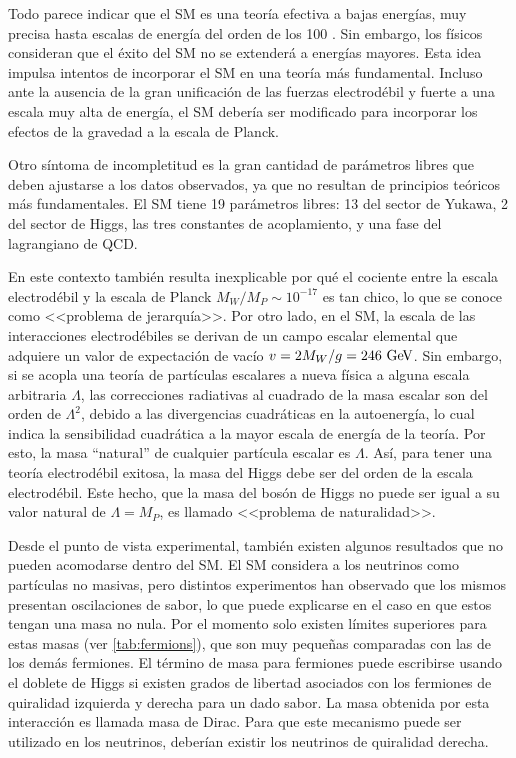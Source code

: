 Todo parece indicar que el SM es una teoría efectiva a bajas energías, muy
precisa hasta escalas de energía del orden de los 100 {\gev}. Sin embargo, los
físicos consideran que el éxito del SM no se extenderá a energías mayores. Esta
idea impulsa intentos de incorporar el SM en una teoría más fundamental. Incluso
ante la ausencia de la gran unificación de las fuerzas electrodébil y fuerte a
una escala muy alta de energía, el SM debería ser modificado para incorporar los
efectos de la gravedad a la escala de Planck.

Otro síntoma de incompletitud es la gran cantidad de parámetros libres que deben
ajustarse a los datos observados, ya que no resultan de principios teóricos más
fundamentales. El SM tiene 19 parámetros libres: 13 del sector de Yukawa, 2 del
sector de Higgs, las tres constantes de acoplamiento, y una fase del lagrangiano
de QCD.

En este contexto también resulta inexplicable por qué el cociente entre la escala
electrodébil y la escala de Planck $M_W/M_P \sim 10^{-17}$ es tan chico, lo que
se conoce como <<problema de jerarquía>>.
Por otro lado, en el SM, la escala de las interacciones electrodébiles se derivan de un
campo escalar elemental que adquiere un valor de expectación de vacío $v = 2
M_W /g = 246 \gev$. Sin embargo, si se acopla una teoría de partículas
escalares a nueva física a alguna escala arbitraria $\Lambda$, las correcciones
radiativas al cuadrado de la masa escalar son del orden de $\Lambda^2$, debido a
las divergencias cuadráticas en la autoenergía, lo cual indica la sensibilidad
cuadrática a la mayor escala de energía de la teoría. Por esto, la masa
``natural'' de cualquier partícula escalar es $\Lambda$. Así, para tener una teoría
electrodébil exitosa, la masa del Higgs debe ser del orden de la escala
electrodébil. Este hecho, que la masa del bosón de Higgs no puede ser igual a su
valor natural de $\Lambda = M_P$, es llamado <<problema de naturalidad>>.

Desde el punto de vista experimental, también existen algunos resultados que no
pueden acomodarse dentro del SM. El SM considera a los neutrinos como partículas
no masivas, pero distintos
experimentos\cite{PhysRevLett.101.111301,PhysRevD.78.032002} han observado que
los mismos presentan oscilaciones de sabor, lo que puede explicarse en el caso
en que estos tengan una masa no nula. Por el momento solo existen límites
superiores para estas masas (ver \cref{tab:fermions}), que son muy peque\~nas
comparadas con las de los demás fermiones. El término de masa para fermiones
puede escribirse usando el doblete de Higgs si existen grados de libertad
asociados con los fermiones de quiralidad izquierda y derecha para un dado
sabor. La masa obtenida por esta interacción es llamada masa de Dirac. Para que
este mecanismo puede ser utilizado en los neutrinos, deberían existir los
neutrinos de quiralidad derecha.

